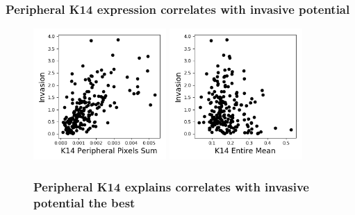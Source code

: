 \documentclass{beamer} %
\begin{document}
\begin{frame}
	\frametitle{Peripheral K14 expression correlates with invasive potential}
	\begin{figure}		
		\centering
		\includegraphics[height=5cm]{Corr_K14}
		\includegraphics[height=5cm]{Corr_K14_mean}
	\end{figure}
\end{frame}


\begin{frame}
	\begin{figure}
		\frametitle{Peripheral K14 explains correlates with invasive potential the best}
		\centering
	\end{figure}
\end{frame}
\end{document}
